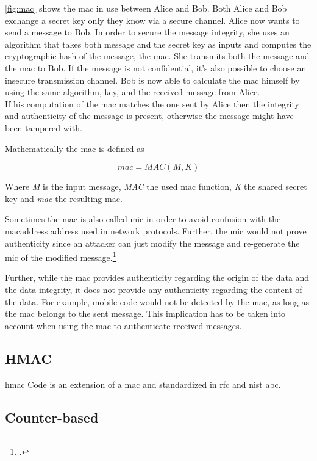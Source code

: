 \autoref{fig:mac} shows the \gls{mac} in use between Alice and Bob. Both Alice and Bob exchange a secret key only they know via a secure channel. Alice now wants to send a message to Bob. In order to secure the message integrity, she uses an algorithm that takes both message and the secret key as inputs and computes the cryptographic hash of the message, the \gls{mac}. She transmits both the message and the \gls{mac} to Bob. If the message is not confidential, it's also possible to choose an insecure transmission channel. Bob is now able to calculate the \gls{mac} himself by using the same algorithm, key, and the received message from Alice.\\
If his computation of the \gls{mac} matches the one sent by Alice then the integrity and authenticity of the message is present, otherwise the message might have been tampered with.

Mathematically the \gls{mac} is defined as

\begin{equation*}
  	mac = MAC(M, K)
\end{equation*}

Where \textit{M} is the input message, \textit{MAC} the used \gls{mac} function, \textit{K} the shared secret key and \textit{mac} the resulting \glsdesc{mac}.

Sometimes the \gls{mac} is also called \gls{mic} in order to avoid confusion with the \gls{macaddress} address used in network protocols. Further, the \gls{mic} would not prove authenticity since an attacker can just modify the message and re-generate the \gls{mic} of the modified message.\footcites[See][60-62]{265831}

Further, while the \gls{mac} provides authenticity regarding the origin of the data and the data integrity, it does not provide any authenticity regarding the content of the data. For example, mobile code would not be detected by the \gls{mac}, as long as the \gls{mac} belongs to the sent message. This implication has to be taken into account when using the \gls{mac} to authenticate received messages.

\subsection{HMAC}

\gls{hmac} Code is an extension of a \gls{mac} and standardized in \gls{rfc} and \gls{nist} abc.
\cite{krawczyk1997rfc}

\subsection{Counter-based}
\label{subsec:hotp}


